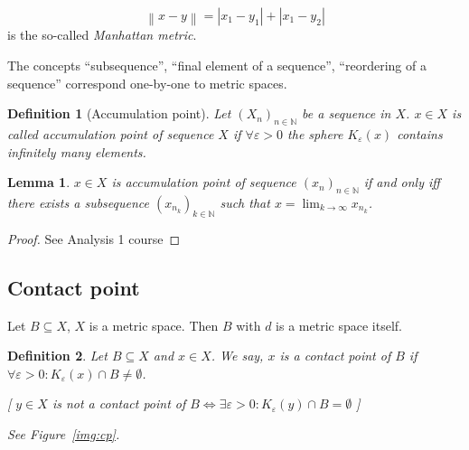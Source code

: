 \documentclass{article}
\newtheorem{definition}{Definition}  \numberwithin{definition}{section}
\newtheorem{lemma}{Lemma}  \numberwithin{lemma}{section}
\newcommand{\norm}[1]{\left\|#1\right\|}
\newcommand{\card}[1]{\left|#1\right|}
\begin{document}
\[ \norm{x - y} = \card{x_1 - y_1} + \card{x_1 - y_2} \]
is the so-called \emph{Manhattan metric}.

The concepts \enquote{subsequence}, \enquote{final element of a sequence}, \enquote{reordering of a sequence} correspond one-by-one to metric spaces.

\begin{definition}[Accumulation point]
  Let $(X_n)_{n\in\mathbb N}$ be a sequence in $X$. $x \in X$ is called \emph{accumulation point of sequence $X$}
  if $\forall \varepsilon > 0$ the sphere $K_{\varepsilon}(x)$ contains infinitely many elements.
\end{definition}

\begin{lemma}
  $x \in X$ is accumulation point of sequence $(x_n)_{n\in\mathbb N}$
  if and only iff there exists a subsequence $(x_{n_k})_{k \in \mathbb N}$ such that
  $x = \lim_{k\to\infty} x_{n_k}$.
\end{lemma}

\begin{proof}
  See Analysis 1 course
\end{proof}

\subsection{Contact point}

Let $B \subseteq X$, $X$ is a metric space. Then $B$ with $d$ is a metric space itself.

\begin{definition}
  Let $B \subseteq X$ and $x \in X$. We say, $x$ is a \emph{contact point of $B$}
  if $\forall \varepsilon > 0: K_{\varepsilon}(x) \cap B \neq \emptyset$.

  [ $y \in X$ is not a contact point of $B \iff \exists \varepsilon > 0: K_{\varepsilon}(y) \cap B = \emptyset$ ]

  See Figure~\ref{img:cp}.
\end{definition}
\end{document}
